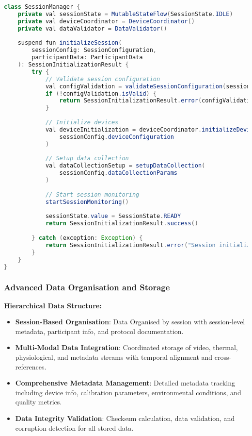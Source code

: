 \documentclass[11pt,a4paper]{report}
\begin{document}
\begin{lstlisting}[language=Java]
class SessionManager {
    private val sessionState = MutableStateFlow(SessionState.IDLE)
    private val deviceCoordinator = DeviceCoordinator()
    private val dataValidator = DataValidator()
    
    suspend fun initializeSession(
        sessionConfig: SessionConfiguration,
        participantData: ParticipantData
    ): SessionInitializationResult {
        try {
            // Validate session configuration
            val configValidation = validateSessionConfiguration(sessionConfig)
            if (!configValidation.isValid) {
                return SessionInitializationResult.error(configValidation.errors)
            }
            
            // Initialize devices
            val deviceInitialization = deviceCoordinator.initializeDevices(
                sessionConfig.deviceConfiguration
            )
            
            // Setup data collection
            val dataCollectionSetup = setupDataCollection(
                sessionConfig.dataCollectionParams
            )
            
            // Start session monitoring
            startSessionMonitoring()
            
            sessionState.value = SessionState.READY
            return SessionInitializationResult.success()
            
        } catch (exception: Exception) {
            return SessionInitializationResult.error("Session initialization failed: ${exception.message}")
        }
    }
}
\end{lstlisting}

\subsubsection{Advanced Data Organisation and Storage}

\textbf{Hierarchical Data Structure:}
\begin{itemize}
  \item \textbf{Session-Based Organisation}: Data Organised by session with session-level metadata, participant info, and protocol documentation.
  \item \textbf{Multi-Modal Data Integration}: Coordinated storage of video, thermal, physiological, and metadata streams with temporal alignment and cross-references.
  \item \textbf{Comprehensive Metadata Management}: Detailed metadata tracking including device info, calibration parameters, environmental conditions, and quality metrics.
  \item \textbf{Data Integrity Validation}: Checksum calculation, data validation, and corruption detection for all stored data.
\end{itemize}
\end{document}
